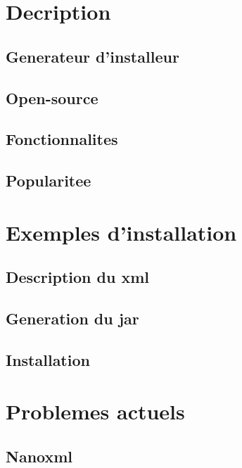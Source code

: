 \section{Decription}
\subsection{Generateur d'installeur}
\subsection{Open-source}
\subsection{Fonctionnalites}
\subsection{Popularitee}
\section{Exemples d'installation}
\subsection{Description du xml}
\subsection{Generation du jar}
\subsection{Installation}
\section{Problemes actuels}
\subsection{Nanoxml}
